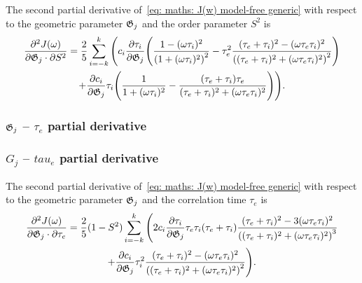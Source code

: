 The second partial derivative of~\eqref{eq: maths: J(w) model-free generic} with respect to the geometric parameter $\mathfrak{G}_j$ and the order parameter $S^2$ is
\begin{multline}
    \frac{\partial^2 J(\omega)}{\partial \mathfrak{G}_j \cdot \partial S^2} = \frac{2}{5} \sum_{i=-k}^k \Bigg(
        c_i \frac{\partial \tau_i}{\partial \mathfrak{G}_j} \Bigg(
            \frac{1 - (\omega \tau_i)^2}{\left(1 + (\omega \tau_i)^2 \right)^2}
            - \tau_e^2 \frac{(\tau_e + \tau_i)^2 - (\omega \tau_e \tau_i)^2}{\left((\tau_e + \tau_i)^2 + (\omega \tau_e \tau_i)^2 \right)^2}
        \Bigg) \\
        +  \frac{\partial c_i}{\partial \mathfrak{G}_j} \tau_i \Bigg(
            \frac{1}{1 + (\omega \tau_i)^2}
            - \frac{(\tau_e + \tau_i)\tau_e}{(\tau_e + \tau_i)^2 + (\omega \tau_e \tau_i)^2}
        \Bigg)
    \Bigg).
\end{multline}



\begin{latexonly}
    \subsubsection{$\mathfrak{G}_j$ -- $\tau_e$ partial derivative}
\end{latexonly}
\begin{htmlonly}
    \subsubsection{$G_j$ -- $tau_e$ partial derivative}
\end{htmlonly}

The second partial derivative of~\eqref{eq: maths: J(w) model-free generic} with respect to the geometric parameter $\mathfrak{G}_j$ and the correlation time $\tau_e$ is
\begin{multline}
    \frac{\partial^2 J(\omega)}{\partial \mathfrak{G}_j \cdot \partial \tau_e} = \frac{2}{5} (1 - S^2) \sum_{i=-k}^k \Bigg(
        2 c_i \frac{\partial \tau_i}{\partial \mathfrak{G}_j} \tau_e \tau_i (\tau_e + \tau_i)
            \frac{(\tau_e + \tau_i)^2 - 3(\omega \tau_e \tau_i)^2}{\left((\tau_e + \tau_i)^2 + (\omega \tau_e \tau_i)^2 \right)^3}  \\
        + \frac{\partial c_i}{\partial \mathfrak{G}_j} \tau_i^2 \frac{(\tau_e + \tau_i)^2 - (\omega \tau_e \tau_i)^2}{\left((\tau_e + \tau_i)^2 + (\omega \tau_e \tau_i)^2 \right)^2}
    \Bigg).
\end{multline}


